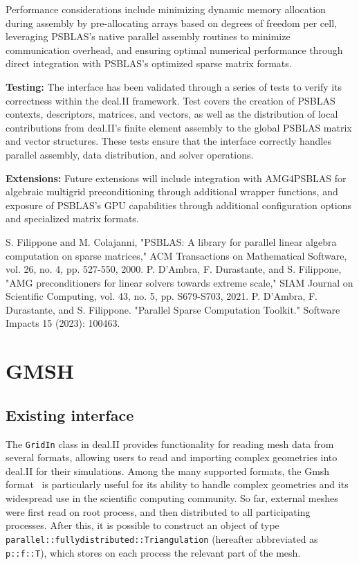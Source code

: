\documentclass[a4paper,12pt]{article}
\begin{document}
Performance considerations include minimizing dynamic memory allocation 
during assembly by pre-allocating arrays based on degrees of freedom per cell, 
leveraging PSBLAS's native parallel assembly routines to minimize communication 
overhead, and ensuring optimal numerical performance through direct 
integration with PSBLAS's optimized sparse matrix formats.

\textbf{Testing:} The interface has been validated through a series of tests
to verify its correctness within the deal.II framework. Test covers the creation of PSBLAS contexts,
descriptors, matrices, and vectors, as well as the distribution of local contributions
from deal.II's finite element assembly to the global PSBLAS matrix and vector structures.
These tests ensure that the interface correctly handles parallel assembly,
data distribution, and solver operations.

\textbf{Extensions:} Future extensions will include integration with AMG4PSBLAS for algebraic multigrid 
preconditioning through additional wrapper functions, and exposure of PSBLAS's GPU capabilities through 
additional configuration options and specialized matrix formats.


\begin{thebibliography}{10}
     S. Filippone and M. Colajanni, "PSBLAS: A library for parallel linear algebra computation on sparse matrices," ACM Transactions on Mathematical Software, vol. 26, no. 4, pp. 527-550, 2000.
     P. D'Ambra, F. Durastante, and S. Filippone, "AMG preconditioners for linear solvers towards extreme scale," SIAM Journal on Scientific Computing, vol. 43, no. 5, pp. S679-S703, 2021.
     P. D’Ambra, F. Durastante, and S. Filippone. "Parallel Sparse Computation Toolkit." Software Impacts 15 (2023): 100463.
\end{thebibliography}

\newpage


\section{GMSH}
\label{sec:gmsh}

\subsection{Existing interface}
The \texttt{GridIn} class in deal.II provides functionality for reading
mesh data from several formats, allowing users to read and importing
complex geometries into deal.II for their simulations. Among the many supported formats,
the Gmsh format~\cite{gmsh} is particularly useful for its ability to handle complex geometries
and its widespread use in the scientific computing community. So far, external meshes
were first read on root process, and then distributed to all
participating processes. After this, it is possible to construct an object of type
\texttt{parallel::fullydistributed::Triangulation} (hereafter abbreviated as \texttt{p::f::T}), which stores on each process
the relevant part of the mesh.
\end{document}
